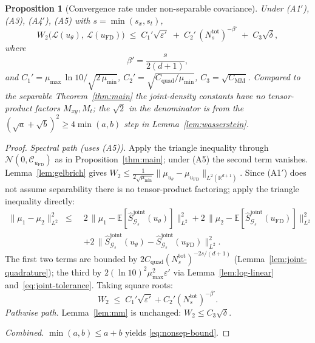 \documentclass[review,12pt]{elsarticle}
\newtheorem{proposition}{Proposition}
\begin{document}
\begin{proposition}[Convergence rate under non-separable covariance]
\label{thm:nonsep}
Under (A1$'$), (A3), (A4$'$), (A5) with \(s = \min(s_x, s_t)\),
\begin{equation}
\label{eq:nonsep-bound}
W_2\bigl(\mathcal L(u_\theta),\,\mathcal L(u_{\mathrm{FD}})\bigr)
\;\le\; C_1'\sqrt{\varepsilon'}
\;+\; C_2'\,(N_s^{\mathrm{tot}})^{-\beta'}
\;+\; C_3\sqrt{\delta},
\end{equation}
where
\[
\beta' = \frac{s}{2(d+1)},
\]
and \(C_1' = \mu_{\max}\,\ln 10 / \sqrt{2\,\mu_{\min}}\),
\(C_2' = \sqrt{C_{\mathrm{quad}}/\mu_{\min}}\),
\(C_3 = \sqrt{C_{\mathrm{MM}}}\).
Compared to the separable Theorem~\ref{thm:main} the joint-density
constants have no tensor-product factors \(M_{xy},M_t\); the
\(\sqrt{2}\) in the denominator is from the
\((\sqrt{a}+\sqrt{b})^2 \ge 4\min(a,b)\) step in
Lemma~\ref{lem:wasserstein}.
\end{proposition}
\begin{proof}
\emph{Spectral path (uses (A5)).} Apply the triangle inequality
through \(\mathcal N(0, \mathcal C_{u_{\mathrm{FD}}})\) as in
Proposition~\ref{thm:main}; under (A5) the second term vanishes.
Lemma~\ref{lem:gelbrich} gives
\(W_2 \le \tfrac{1}{2\sqrt{\mu_{\min}}}
\|\mu_{u_\theta} - \mu_{u_{\mathrm{FD}}}\|_{L^2(\mathbb R^{d+1})}\).
Since (A1$'$) does not assume separability there is no
tensor-product factoring; apply the triangle inequality directly:
\begin{align*}
\|\mu_1 - \mu_2\|^2_{L^2}
\;\le\;&
2\,\bigl\|\mu_1 -
\mathbb E[\widehat S^{\mathrm{joint}}_{\mathcal G_s}(u_\theta)]\bigr\|^2_{L^2}
+ 2\,\bigl\|\mu_2 -
\mathbb E[\widehat S^{\mathrm{joint}}_{\mathcal G_s}(u_{\mathrm{FD}})]\bigr\|^2_{L^2}
\\
&+ 2\,\bigl\|\widehat S^{\mathrm{joint}}_{\mathcal G_s}(u_\theta)
- \widehat S^{\mathrm{joint}}_{\mathcal G_s}(u_{\mathrm{FD}})\bigr\|^2_{L^2}.
\end{align*}
The first two terms are bounded by
\(2C_{\mathrm{quad}}(N_s^{\mathrm{tot}})^{-2s/(d+1)}\)
(Lemma~\ref{lem:joint-quadrature}); the third by
\(2(\ln 10)^2\mu_{\max}^2\varepsilon'\) via
Lemma~\ref{lem:log-linear} and~\eqref{eq:joint-tolerance}. Taking
square roots:
\[
W_2 \;\le\; C_1'\sqrt{\varepsilon'} + C_2'(N_s^{\mathrm{tot}})^{-\beta'}.
\tag{$\star'$}\label{eq:spectral-path-nonsep}
\]
\emph{Pathwise path.} Lemma~\ref{lem:mm} is unchanged:
\(W_2 \le C_3\sqrt\delta\).

\emph{Combined.} \(\min(a,b) \le a + b\) yields \eqref{eq:nonsep-bound}.
\end{proof}
\end{document}
